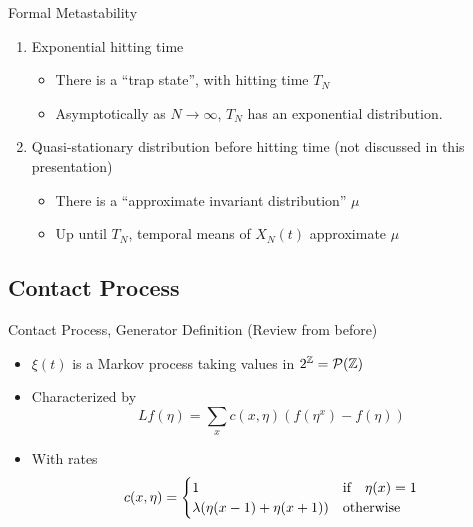 \documentclass{beamer}
\begin{document}
\begin{frame}{Formal Metastability}
  \begin{enumerate}
    \item Exponential hitting time
    \begin{itemize}
      \item There is a ``trap state'', with hitting time $T_{N}$
      \item Asymptotically as $N \to \infty$, $T_{N}$ has an exponential distribution.
    \end{itemize}
    \pause
    \item Quasi-stationary distribution before hitting time (not discussed in this presentation)
    \begin{itemize}
      \item There is a ``approximate invariant distribution'' $\mu$
      \item Up until $T_{N}$, temporal means of $X_{N}(t)$ approximate $\mu$
    \end{itemize}
  \end{enumerate}
\end{frame}

\subsection{Contact Process}

\begin{frame}{Contact Process, Generator Definition}
  (Review from before)
  \begin{itemize}
    \item $\xi(t)$ is a Markov process taking values in $2^{\mathbb{Z}} = \mathcal{P}(\mathbb{Z})$
    \item Characterized by
      \begin{equation}
        \label{eq:definition_contact_proc}
        Lf(\eta) = \sum_{x} c(x,\eta)(f(\eta^{x}) - f(\eta))
      \end{equation}
    \item With rates
      \begin{equation}
        \label{eq:contact_proc_rates}
        c(x,\eta) = \begin{cases}
          1 & \qif* \eta(x) = 1 \\
          \lambda(\eta(x-1) + \eta(x+1)) & \qotherwise*
        \end{cases}
      \end{equation}
  \end{itemize}
\end{frame}
\end{document}
